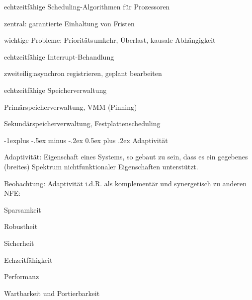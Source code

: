 \documentclass[a4paper]{article}
\makeatletter
\renewcommand{\subsection}{\@startsection{subsection}{2}{0mm}%
 {-1explus -.5ex minus -.2ex}%
 {0.5ex plus .2ex}%
 {\normalfont\normalsize\bfseries}}
\makeatother
\begin{document}
\begin{multicols}{3}
    \begin{enumerate*}
        \item echtzeitfähige Scheduling-Algorithmen für Prozessoren
        \begin{itemize*}
            \item zentral: garantierte Einhaltung von Fristen
            \item wichtige Probleme: Prioritätsumkehr, Überlast, kausale Abhängigkeit
        \end{itemize*}
        \item echtzeitfähige Interrupt-Behandlung
        \begin{itemize*}
            \item zweiteilig:asynchron registrieren, geplant bearbeiten
        \end{itemize*}
        \item echtzeitfähige Speicherverwaltung
        \begin{itemize*}
            \item Primärspeicherverwaltung, VMM (Pinning)
            \item Sekundärspeicherverwaltung, Festplattenscheduling
        \end{itemize*}
    \end{enumerate*}


    \subsection{Adaptivität}

    \begin{itemize*}
        \item Adaptivität: Eigenschaft eines Systems, so gebaut zu sein, dass es ein
        gegebenes (breites) Spektrum nichtfunktionaler Eigenschaften
        unterstützt.
        \item Beobachtung: Adaptivität i.d.R. als komplementär und synergetisch zu
        anderen NFE:
        \begin{itemize*}
            \item Sparsamkeit
            \item Robustheit
            \item Sicherheit
            \item Echzeitfähigkeit
            \item Performanz
            \item Wartbarkeit und Portierbarkeit
        \end{itemize*}
    \end{itemize*}


\end{multicols}
\end{document}

